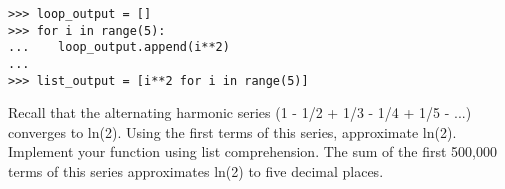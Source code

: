 \begin{lstlisting}
>>> loop_output = []
>>> for i in range(5):
...    loop_output.append(i**2)
...
>>> list_output = [i**2 for i in range(5)]
\end{lstlisting}

\begin{problem}
Recall that the alternating harmonic series (1 - 1/2 + 1/3 - 1/4 + 1/5 - ...) converges to ln(2).  Using the first  terms of this series, approximate ln(2).  Implement your function using list comprehension.  The sum of the first 500,000 terms of this series approximates ln(2) to five decimal places.
\end{problem}

\begin{comment}
\section*{Specifications}
We suggest that you submit your solutions in a file called \li{solutions.py}, using the following format.

\end{comment}